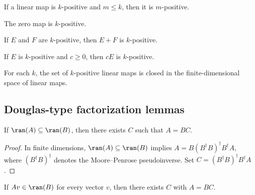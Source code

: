 \begin{theorem}
    \leanok
    If a linear map is $k$-positive and $m \le k$, then it is $m$-positive.
\end{theorem}

\begin{theorem}
    \leanok
    The zero map is $k$-positive.
\end{theorem}

\begin{theorem}
    \leanok
    If $E$ and $F$ are $k$-positive, then $E+F$ is $k$-positive.
\end{theorem}

\begin{theorem}
    \leanok
    If $E$ is $k$-positive and $c \ge 0$, then $cE$ is $k$-positive.
\end{theorem}

\begin{theorem}
    \leanok
    For each $k$, the set of $k$-positive linear maps is closed in the
    finite-dimensional space of linear maps.
\end{theorem}

\subsection{Douglas-type factorization lemmas}

\begin{theorem}
    \leanok
    If $\ran(A) \subseteq \ran(B)$, then
    there exists $C$ such that $A = B C$.
\end{theorem}

\begin{proof}
    In finite dimensions, $\ran(A) \subseteq \ran(B)$ implies
    $A=B(B^\dagger B)^\dagger B^\dagger A$, where
    $(B^\dagger B)^\dagger$ denotes the Moore--Penrose pseudoinverse.
    Set $C=(B^\dagger B)^\dagger B^\dagger A$.
\end{proof}

\begin{theorem}
    \leanok
    If $A v \in \ran(B)$ for every vector $v$, then
    there exists $C$ with $A = B C$.
\end{theorem}

